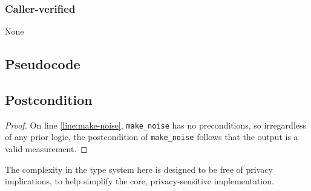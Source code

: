 \documentclass{article}
\begin{document}
\subsubsection*{Caller-verified}
None

\subsection*{Pseudocode}


\subsection*{Postcondition}
\begin{theorem}
\end{theorem}

\begin{proof}
    On line \ref{line:make-noise}, \texttt{make\_noise} has no preconditions,
    so irregardless of any prior logic,
    the postcondition of \texttt{make\_noise} follows that the output is a valid measurement.
\end{proof}

The complexity in the type system here is designed to be free of privacy implications,
to help simplify the core, privacy-sensitive implementation.
\end{document}
